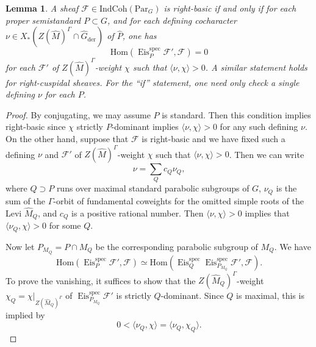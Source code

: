 \documentclass{amsart}
\newtheorem{lemma}[theorem]{Lemma}
\theoremstyle{definition}
\theoremstyle{remark}
\numberwithin{equation}{section}
\newcommand{\der}{\mathrm{der}}
\newcommand{\mc}{\mathcal}
\newcommand{\Hom}{\mathrm{Hom}}
\newcommand{\spec}{\mathrm{spec}}
\newcommand{\wh}{\widehat}
\newcommand{\Par}{\mathrm{Par}}
\newcommand{\IndCoh}{\mathrm{IndCoh}}
\DeclareMathOperator{\Eis}{\mathrm{Eis}}
\begin{document}
\begin{lemma}{\label{lem: ParGdomswitch}}
    A sheaf $\mc{F} \in \IndCoh(\Par_G)$ is right-basic if and only if for each proper semistandard $P \subset G$, and for each defining cocharacter $\nu \in X_{\ast}(Z(\wh{M})^{\Gamma} \cap \wh{G}_{\der})$ of $\wh{P}$, one has
    \begin{equation*}
        \Hom(\Eis^\spec_P \mc{F}', \mc{F}) = 0 
    \end{equation*}
    for each $\mc{F}'$ of $Z(\wh M)^{\Gamma}$-weight $\chi$ such that $\langle \nu, \chi \rangle > 0$.  A similar statement holds for right-cuspidal sheaves. For the ``if'' statement, one need only check a single defining $\nu$ for each $P$.
\end{lemma}
\begin{proof}
    By conjugating, we may assume $P$ is standard. Then this condition implies right-basic since $\chi$ strictly $P$-dominant implies $\langle \nu, \chi \rangle > 0$ for any such defining $\nu$. On the other hand, suppose that $\mc{F}$ is right-basic and we have fixed such a defining $\nu$ and $\mc{F}'$ of $Z(\wh M)^{\Gamma}$-weight $\chi$ such that $\langle \nu, \chi \rangle > 0$. Then we can write
    \begin{equation*}
        \nu = \sum\limits_Q c_Q \nu_Q,
    \end{equation*}
    where $Q \supset P$ runs over maximal standard parabolic subgroups of $G$, $\nu_Q$ is the sum of the $\Gamma$-orbit of fundamental coweights for the omitted simple roots of the Levi $\wh M_Q$, and $c_Q$ is a positive rational number. Then $\langle \nu, \chi \rangle > 0$ implies that $\langle \nu_Q, \chi\rangle > 0$ for some $Q$.
    
    Now let $P_{M_Q} = P \cap M_Q$ be the corresponding parabolic subgroup of $M_Q$. We have
    \begin{equation*}
        \Hom(\Eis^\spec_P \mc{F}', \mc{F}) \simeq \Hom(\Eis^\spec_Q \Eis^\spec_{P_{M_Q}} \mc{F}', \mc{F}). 
    \end{equation*}
To prove the vanishing, it suffices to show that the $Z(\wh{M}_Q)^\Gamma$-weight $\chi_Q = \chi|_{Z(\wh{M}_Q)^{\Gamma}}$ of $\Eis^\spec_{P_{M_Q}} \mc{F}'$ is strictly $Q$-dominant. Since $Q$ is maximal, this is implied by
\begin{equation*}
    0 < \langle \nu_Q, \chi \rangle = \langle \nu_Q, \chi_Q \rangle.
\end{equation*}
\end{proof}
\end{document}
